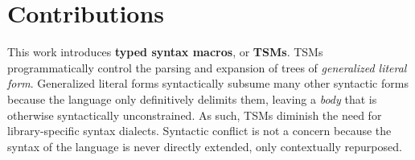 





\section{Contributions}\label{sec:contributions}
This work introduces \textbf{typed syntax macros}, or \textbf{TSMs}. TSMs programmatically control the parsing and expansion of trees of \emph{generalized literal form}. Generalized literal forms syntactically subsume many other syntactic forms because the language only definitively delimits them, leaving a \emph{body} that is otherwise syntactically unconstrained. As such, TSMs diminish the need for library-specific syntax dialects. Syntactic conflict is not a concern because the syntax of the language is never directly extended, only contextually repurposed.

